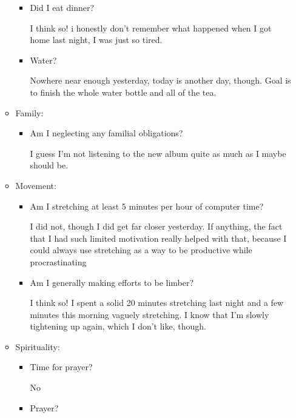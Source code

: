 \documentclass[12pt]{article}
\renewcommand{\,}{\textsuperscript{,}}
\begin{document}
\begin{enumerate}
\begin{itemize}
\begin{itemize}
\item Did I eat dinner?

I think so! i honestly don't remember what happened when I got home last night, I was just so tired.

\item Water?

Nowhere near enough yesterday, today is another day, though. Goal is to finish the whole water bottle and all of the tea.

\end{itemize}

\item Family:

\begin{itemize}

\item Am I neglecting any familial obligations?

I guess I'm not listening to the new album quite as much as I maybe should be.

\end{itemize}

\item Movement:

\begin{itemize}

\item Am I stretching at least 5 minutes per hour of computer time?

I did not, though I did get far closer yesterday. If anything, the fact that I had such limited motivation really helped with that, because I could always use stretching as a way to be productive while procrastinating

\item Am I generally making efforts to be limber?

I think so! I spent a solid 20 minutes stretching last night and a few minutes this morning vaguely stretching. I know that I'm slowly tightening up again, which I don't like, though.

\end{itemize}

\item Spirituality:

\begin{itemize}

\item Time for prayer?

No

\item Prayer?


\end{itemize}
\end{itemize}
\end{enumerate}
\end{document}
